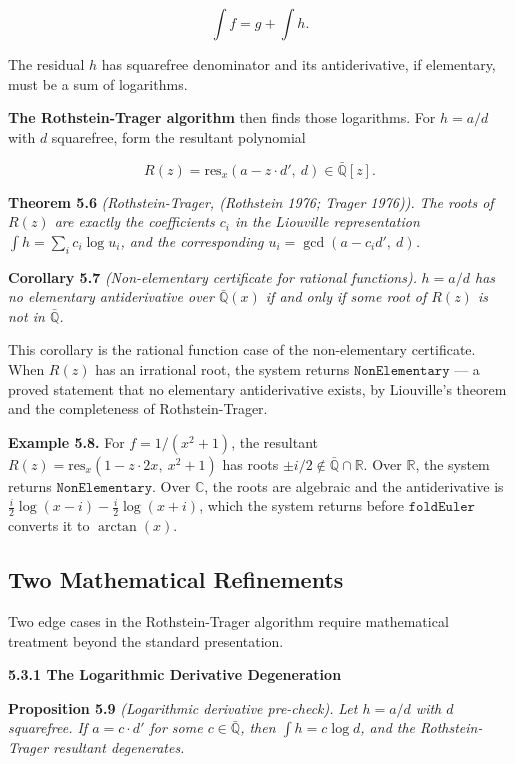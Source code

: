 \documentclass[12pt]{article}
\begin{document}
\[\int f = g + \int h.\]

The residual \(h\) has squarefree denominator and its antiderivative, if
elementary, must be a sum of logarithms.

\textbf{The Rothstein-Trager algorithm} then finds those logarithms. For
\(h = a/d\) with \(d\) squarefree, form the resultant polynomial

\[R(z) = \mathrm{res}_x(a - z \cdot d',\ d) \in \bar{\mathbb{Q}}[z].\]

\textbf{Theorem 5.6} \emph{(Rothstein-Trager, (Rothstein 1976; Trager
1976)).} \emph{The roots of \(R(z)\) are exactly the coefficients
\(c_i\) in the Liouville representation
\(\int h = \sum_i c_i \log u_i\), and the corresponding
\(u_i = \gcd(a - c_i d',\ d)\).}

\textbf{Corollary 5.7} \emph{(Non-elementary certificate for rational
functions).} \emph{\(h = a/d\) has no elementary antiderivative over
\(\bar{\mathbb{Q}}(x)\) if and only if some root of \(R(z)\) is not in
\(\bar{\mathbb{Q}}\).}

This corollary is the rational function case of the non-elementary
certificate. When \(R(z)\) has an irrational root, the system returns
\(\mathtt{NonElementary}\) --- a proved statement that no elementary
antiderivative exists, by Liouville's theorem and the completeness of
Rothstein-Trager.

\textbf{Example 5.8.} For \(f = 1/(x^2 + 1)\), the resultant
\(R(z) = \mathrm{res}_x(1 - z \cdot 2x,\ x^2+1)\) has roots
\(\pm i/2 \notin \bar{\mathbb{Q}} \cap \mathbb{R}\). Over
\(\mathbb{R}\), the system returns \(\mathtt{NonElementary}\). Over
\(\mathbb{C}\), the roots are algebraic and the antiderivative is
\(\frac{i}{2}\log(x-i) - \frac{i}{2}\log(x+i)\), which the system
returns before \(\mathtt{foldEuler}\) converts it to \(\arctan(x)\).




\subsection{Two Mathematical
Refinements}\label{two-mathematical-refinements}

Two edge cases in the Rothstein-Trager algorithm require mathematical
treatment beyond the standard presentation.

\textbf{5.3.1 The Logarithmic Derivative Degeneration}

\textbf{Proposition 5.9} \emph{(Logarithmic derivative pre-check).}
\emph{Let \(h = a/d\) with \(d\) squarefree. If \(a = c \cdot d'\) for
some \(c \in \bar{\mathbb{Q}}\), then \(\int h = c \log d\), and the
Rothstein-Trager resultant degenerates.}
\end{document}

